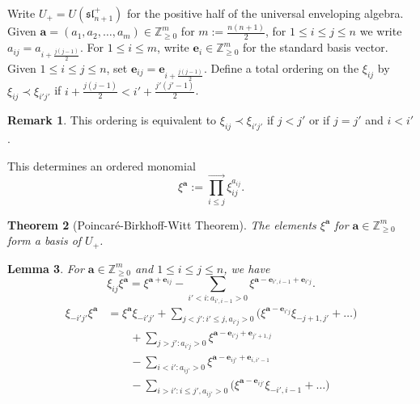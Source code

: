 \documentclass[a4paper]{amsart}
\newtheorem{theorem}{Theorem}%
\newtheorem{lemma}[theorem]{Lemma}
\theoremstyle{definition}
\newtheorem{remark}[theorem]{Remark}
\newcommand{\ZZ}{\mathbb{Z}}
\newcommand{\bfa}{\mathbf{a}}
\newcommand{\bfe}{\mathbf{e}}
\renewcommand{\sl}{\mathfrak{sl}}
\begin{document}
Write $U_+=U(\sl_{n+1}^+)$ for the positive half of the universal enveloping algebra.
Given $\bfa=(a_1,a_2,\ldots,a_m)\in\ZZ_{\ge0}^m$ for $m:=\frac{n(n+1)}{2}$, for $1\le i\le j\le n$ we write $a_{ij}=a_{i+\frac{j(j-1)}{2}}$.
For $1\le i\le m$, write $\bfe_i\in\ZZ_{\ge0}^m$ for the standard basis vector.
Given $1\le i\le j\le n$, set $\bfe_{ij}=\bfe_{i+\frac{j(j-1)}{2}}$.
Define a total ordering on the $\xi_{ij}$ by $\xi_{ij}\prec \xi_{i'j'}$ if $i+\frac{j(j-1)}{2}<i'+\frac{j'(j'-1)}{2}$.
\begin{remark}
  This ordering is equivalent to $\xi_{ij}\prec \xi_{i'j'}$ if $j<j'$ or if $j=j'$ and $i<i'$.
\end{remark}
This determines an ordered monomial
\[\xi^\bfa:=\overrightarrow{\prod_{i\le j}} \xi_{ij}^{a_{ij}}.\]
\begin{theorem}
  [Poincar\'e-Birkhoff-Witt Theorem]
  The elements $\xi^\bfa$ for $\bfa\in\ZZ_{\ge0}^m$ form a basis of $U_+$.
\end{theorem}

\begin{lemma}
  For $\bfa\in\ZZ_{\ge0}^m$ and $1\le i\le j\le n$, we have
  \[ \xi_{ij} \xi^\bfa=\xi^{\bfa+\bfe_{ij}}-\sum_{i'<i:a_{i',i-1}>0} \xi^{\bfa-\bfe_{i',i-1}+\bfe_{i'j}}. \]
  \begin{align*}
    \xi_{-i'j'} \xi^\bfa
    &=\xi^\bfa \xi_{-i'j'}
    + \sum_{j<j':i'\le j,a_{i'j}>0} \Big( \xi^{\bfa-\bfe_{i'j}} \xi_{-j+1,j'} + \dots \Big)\\
    & \qquad + \sum_{j>j':a_{i'j}>0} \xi^{\bfa-\bfe_{i'j}+\bfe_{j'+1,j}}\\
    & \qquad - \sum_{i<i':a_{ij'}>0} \xi^{\bfa-\bfe_{ij'}+\bfe_{i,i'-1}}\\
    & \qquad - \sum_{i>i':i\le j',a_{ij'}>0} \Big( \xi^{\bfa-\bfe_{ij'}} \xi_{-i',i-1} + \dots \Big)\\
  \end{align*}
\end{lemma} 



\end{document}
